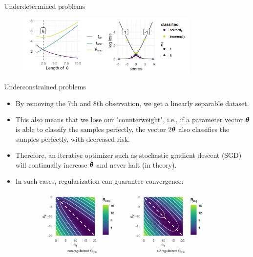 \documentclass[11pt,compress,t,notes=noshow, xcolor=table]{beamer}
\begin{document}
\begin{vbframe} {Underdetermined problems}
\begin{footnotesize}
\begin{figure}
\includegraphics[width=0.8\textwidth]{figure/underdetermined_problem_02.png}\\
\end{figure}


\end{footnotesize}
\end{vbframe}
\begin{vbframe} {Underconstrained problems}
\begin{footnotesize}
\begin{itemize}
\item By removing the 7th and 8th observation, we get a linearly separable dataset. \\
\item This also means that we lose our "counterweight", i.e., if a parameter vector $\bm{\theta}$ is able to classify the samples perfectly, the vector $2\bm{\theta}$ also classifies the samples perfectly, with decreased risk.
    \item Therefore, an iterative optimizer such as stochastic gradient descent (SGD) will continually increase $\bm{\theta}$ and never halt (in theory).
    \item In such cases, regularization can guarantee convergence: 
    
    
\begin{figure}
\includegraphics[width=0.9\textwidth]{figure/underconstrained_problem.png}\\
\end{figure}

    
\end{itemize}
\end{footnotesize}
\end{vbframe}

\endlecture
\end{document}
